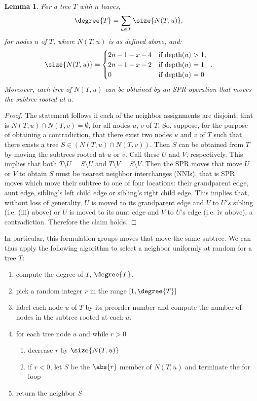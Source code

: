 \documentclass[11pt,onecolumn,conference]{IEEEtran}
\newtheorem{lemma}[theorem]{Lemma}
\begin{document}
\begin{lemma}
	\label{lem:compute_degree}
	For a tree $T$ with $n$ leaves,
	$$\degree{T} = \sum_{u \in T} \size{N(T,u)},$$
	for nodes $u$ of $T$, where $N(T,u)$ is as defined above, and:
	$$\size{N(T,u)} = \begin{cases}
		2n - 1 - x - 4 &\text{if depth($u$) $ > 1$, } \\
		2n - 1 - x - 2 &\text{if depth($u$) $ = 1$ } \\
		0 &\text{if depth($u$) $ = 0$ } \\
	\end{cases}.$$
	Moreover, each tree of $N(T,u)$ can be obtained by an SPR operation that moves the subtree rooted at $u$.
\end{lemma}
\begin{proof}
	The statement follows if each of the neighbor assignments are disjoint, that is $N(T,u) \cap N(T,v) = \emptyset$, for all nodes $u$, $v$ of $T$.
	So, suppose, for the purpose of obtaining a contradiction, that there exist two nodes $u$ and $v$ of $T$ such that there exists a tree $S \in (N(T,u) \cap N(T,v))$.
	Then $S$ can be obtained from $T$ by moving the subtrees rooted at $u$ or $v$.
	Call these $U$ and $V$, respectively.
	This implies that both $T \setminus U = S \setminus U$ and $T \setminus V = S \setminus V$.
	Then the SPR moves that move $U$ or $V$ to obtain $S$ must be nearest neighbor interchanges (NNIs), that is SPR moves which move their subtree to one of four locations: their grandparent edge, aunt edge, sibling's left child edge or sibling's right child edge.
	This implies that, without loss of generality, $U$ is moved to its grandparent edge and $V$ to $U's$ sibling (i.e. (iii) above) or $U$ is moved to its aunt edge and $V$ to $U$'s edge (i.e. iv above), a contradiction.
	Therefore the claim holds.
\end{proof}


In particular, this formulation groups moves that move the same subtree.
We can thus apply the following algorithm to select a neighbor uniformly at random for a tree $T$:

\begin{enumerate}[label={\arabic*}.]
	\item	compute the degree of $T$, $\degree{T}$.
	\item pick a random integer $r$ in the range $[1,\degree{T}]$
	\item label each node $u$ of $T$ by its preorder number and compute the number of nodes in the subtree rooted at each $u$.
\item for each tree node $u$ and while $r > 0$
	\begin{enumerate}
		\item decrease $r$ by $\size{N(T,u)}$
		\item if $r < 0$, let $S$ be the $\abs{r}$ member of $N(T,u)$ and terminate the for loop
	\end{enumerate}
\item return the neighbor $S$
\end{enumerate}
\end{document}
